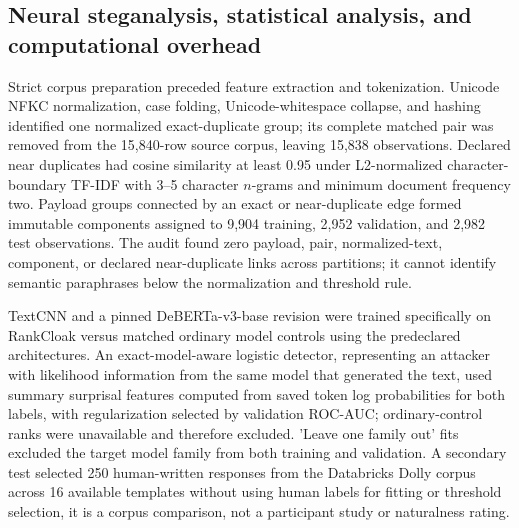 \documentclass[fleqn,10pt]{wlscirep}
\begin{document}
\subsection*{Neural steganalysis, statistical analysis, and computational overhead}\label{sec:detector-method}\label{sec:statistics-method}

Strict corpus preparation preceded feature extraction and tokenization. Unicode NFKC normalization, case folding, Unicode-whitespace collapse, and hashing identified one normalized exact-duplicate group; its complete matched pair was removed from the 15,840-row source corpus, leaving 15,838 observations. Declared near duplicates had cosine similarity at least 0.95 under L2-normalized character-boundary TF-IDF with 3--5 character \(n\)-grams and minimum document frequency two. Payload groups connected by an exact or near-duplicate edge formed immutable components assigned to 9,904 training, 2,952 validation, and 2,982 test observations. The audit found zero payload, pair, normalized-text, component, or declared near-duplicate links across partitions; it cannot identify semantic paraphrases below the normalization and threshold rule.

TextCNN and a pinned DeBERTa-v3-base revision were trained specifically on RankCloak versus matched ordinary model controls using the predeclared architectures. An exact-model-aware logistic detector, representing an attacker with likelihood information from the same model that generated the text, used summary surprisal features computed from saved token log probabilities for both labels, with regularization selected by validation ROC-AUC; ordinary-control ranks were unavailable and therefore excluded. 'Leave one family out' fits excluded the target model family from both training and validation. A secondary test selected 250 human-written responses from the Databricks Dolly corpus across 16 available templates without using human labels for fitting or threshold selection, it is a corpus comparison, not a participant study or naturalness rating.
\end{document}
